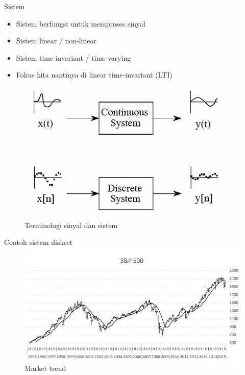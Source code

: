 \documentclass[pdflatex,compress,mathserif]{beamer}
\begin{document}
\begin{frame}{Sistem}
	\begin{itemize}
		\item Sistem berfungsi untuk memproses sinyal
		\item Sistem linear / non-linear
		\item Sistem time-invariant / time-varying
		\item Fokus kita nantinya di linear time-invariant (LTI)
	\end{itemize}
	\begin{figure}
		\centering
		\includegraphics[width=0.5\linewidth]{img/00.sistem}
		\caption{Terminologi sinyal dan sistem}
	\end{figure}
\end{frame}

\begin{frame}{Contoh sistem diskret}
	\begin{figure}
		\centering
		\includegraphics[height=0.7\textheight]{img/00.proses_sinyal_diskret}
		\caption{Market trend}
	\end{figure}
\end{frame}
\end{document}
